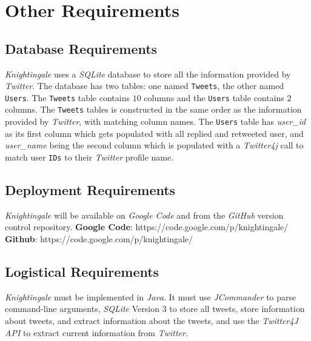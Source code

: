 \documentclass[a4paper, 12pt]{article}
\begin{document}
\section{Other Requirements} \label{sec:other}
\subsection{Database Requirements} \label{sec:database}
\begin{adjustwidth}{2em}{0pt}
\textit{Knightingale} uses a \textit{SQLite} database to store all the information provided by \textit{Twitter}. The database has two tables: one named \texttt{Tweets}, the other named \texttt{Users}. The \texttt{Tweets} table contains $10$ columns and the \texttt{Users} table contains $2$ columns. The \texttt{Tweets} tables is constructed in the same order as the information provided by \textit{Twitter}, with matching column names. The \texttt{Users} table has \textit{user\_id} as its first column which gets populated with all replied and retweeted user, and \textit{user\_name} being the second column which is populated with a \textit{Twitter4j} call to match user \texttt{IDs} to their \textit{Twitter} profile name.
\end{adjustwidth}

\subsection{Deployment Requirements} \label{sec:deployment}
\begin{adjustwidth}{2em}{0pt}
\textit{Knightingale} will be available on \textit{Google Code} and from the \textit{GitHub} version control repository. \newline
\noindent \textbf{Google Code}: https://code.google.com/p/knightingale/ \newline
\noindent \textbf{Github}: https://code.google.com/p/knightingale/
\end{adjustwidth}

\subsection{Logistical Requirements} \label{sec:logistic}
\begin{adjustwidth}{2em}{0pt}
\textit{Knightingale} must be implemented in \textit{Java}. It must use \textit{JCommander} to parse command-line arguments, \textit{SQLite} Version $3$ to store all tweets, store information about tweets, and extract information about the tweets, and use the \textit{Twitter4J API} to extract current information from \textit{Twitter}.
\end{adjustwidth} 
\end{document}
